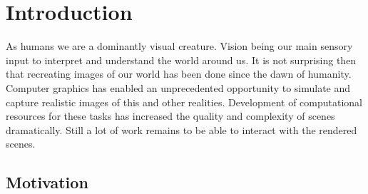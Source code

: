 \chapter{Introduction}\label{cha:intro}










As humans we are a dominantly visual creature. Vision being our main sensory input to interpret and understand the world around us. It is not surprising then that recreating images of our world has been done since the dawn of humanity. Computer graphics has enabled an unprecedented opportunity to simulate and capture realistic images of this and other realities. Development of computational resources for these tasks has increased the quality and complexity of scenes dramatically. Still a lot of work remains to be able to interact with the rendered scenes.

\section{Motivation}


